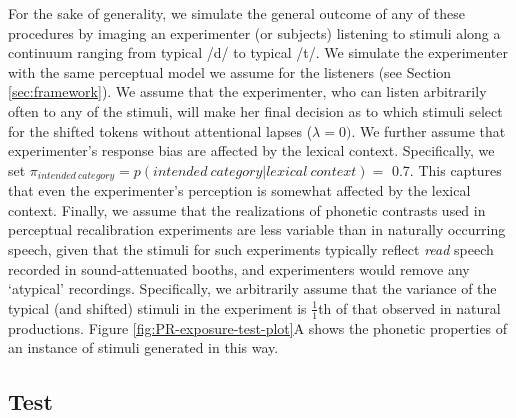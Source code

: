 \documentclass[
  11pt,
  english,
  man,floatsintext]{apa6}
\begin{document}
For the sake of generality, we simulate the general outcome of any of these procedures by imaging an experimenter (or subjects) listening to stimuli along a continuum ranging from typical /d/ to typical /t/. We simulate the experimenter with the same perceptual model we assume for the listeners (see Section \ref{sec:framework}). We assume that the experimenter, who can listen arbitrarily often to any of the stimuli, will make her final decision as to which stimuli select for the shifted tokens without attentional lapses (\(\lambda=0)\). We further assume that experimenter's response bias are affected by the lexical context. Specifically, we set \(\pi_{intended~category} = p(intended~category | lexical~context) =\) 0.7. This captures that even the experimenter's perception is somewhat affected by the lexical context. Finally, we assume that the realizations of phonetic contrasts used in perceptual recalibration experiments are less variable than in naturally occurring speech, given that the stimuli for such experiments typically reflect \emph{read} speech recorded in sound-attenuated booths, and experimenters would remove any `atypical' recordings. Specifically, we arbitrarily assume that the variance of the typical (and shifted) stimuli in the experiment is \(\frac{1}{1}\)th of that observed in natural productions. Figure \ref{fig:PR-exposure-test-plot}A shows the phonetic properties of an instance of stimuli generated in this way.

\hypertarget{test}{%
\subsection{Test}\label{test}}
\end{document}
